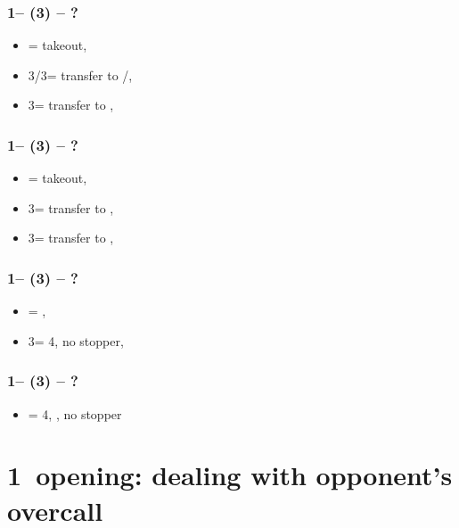 \subsubsection*{1\clubs -- (3\clubs) -- ?}
\begin{itemize}
    \item \dbl = takeout, \gf
    \item 3\diams/3\hearts = transfer to \hearts/\spades, \invp
    \item 3\spades = transfer to \diams, \gf
\end{itemize}

\subsubsection*{1\clubs -- (3\diams) -- ?}
\begin{itemize}
    \item \dbl = takeout, \gf
    \item 3\hearts = transfer to \spades, \invp
    \item 3\spades = transfer to \hearts, \gf
\end{itemize}

\subsubsection*{1\clubs -- (3\hearts) -- ?}
\begin{itemize}
    \item \dbl = \spades, \invp
    \item 3\spades = 4\spades, no \hearts stopper, \gf
\end{itemize}

\subsubsection*{1\clubs -- (3\spades) -- ?}
\begin{itemize}
    \item \dbl = 4\hearts, \gf, no \spades stopper
\end{itemize}

\section{\texorpdfstring{1\diams\ opening: dealing with opponent's overcall}{oppsOvercallTfx1d}}\label{sec:oppsOvercallTfx1d}

